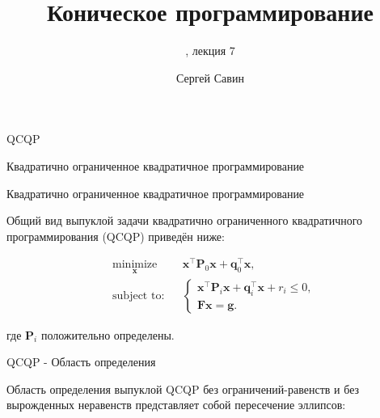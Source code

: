 \documentclass{beamer}
\title{Коническое программирование}
\subtitle{\mycoursetitle, лекция 7}
\author{Сергей Савин}
\date{\mydate}
\begin{document}
\maketitle


%
%
\begin{frame}{QCQP}
	
	{\huge Квадратично ограниченное квадратичное программирование}
	
\end{frame}



\begin{frame}{Квадратично ограниченное квадратичное программирование}
	\begin{flushleft}
		
		Общий вид выпуклой задачи квадратично ограниченного квадратичного программирования (QCQP) приведён ниже:
		
		\begin{equation}
			\begin{aligned}
				& \underset{\mathbf{x}}{\text{minimize}}
				& & \mathbf{x}^\top \mathbf{P}_0 \mathbf{x} + \mathbf{q}_0^\top\mathbf{x}, \\
				& \text{subject to:}
				& & \begin{cases}
					\mathbf{x}^\top \mathbf{P}_i \mathbf{x} + \mathbf{q}_i^\top\mathbf{x} + r_i \leq 0, \\
					\mathbf{F}\mathbf{x} = \mathbf{g}.
				\end{cases}
			\end{aligned}
		\end{equation}
		
		где $\mathbf{P}_i$ положительно определены.
		
	\end{flushleft}
\end{frame}



\begin{frame}{QCQP - Область определения}
	\begin{flushleft}
		
		Область определения выпуклой QCQP без ограничений-равенств и без вырожденных неравенств представляет собой пересечение эллипсов:
		
		\begin{figure} [h!]
			\begin{center}
				
			\end{center} 
		\end{figure}
		
	\end{flushleft}
\end{frame}
\end{document}

